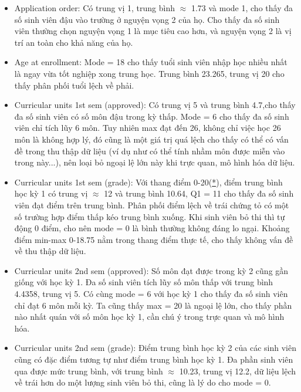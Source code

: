     \begin{itemize}
        \item Application order: Có trung vị 1, trung bình $\approx$ 1.73 và mode 1, cho thấy đa số sinh viên đậu vào trường ở nguyện vọng 2 của họ. Cho thấy đa số sinh viên thường chọn nguyện vọng 1 là mục tiêu cao hơn, và nguyện vọng 2 là vị trí an toàn cho khả năng của họ.

        \item Age at enrollment: Mode = 18 cho thấy tuổi sinh viên nhập học nhiều nhất là ngay vừa tốt nghiệp xong trung học. Trung bình 23.265, trung vị 20 cho thấy phân phối tuổi lệch về phải. 

        \item Curricular units 1st sem (approved): Có trung vị 5 và trung bình 4.7,cho thấy đa số sinh viên có số môn đậu trong kỳ thấp. Mode = 6 cho thấy đa số sinh viên chỉ tích lũy 6 môn. Tuy nhiên max đạt đến 26, không chỉ việc học 26 môn là không hợp lý, đó cũng là một giá trị quá lệch cho thấy có thể có vấn đề trong thu thập dữ liệu (ví dụ như có thể tính nhầm môn được miễn vào trong này...), nên loại bỏ ngoại lệ lớn này khi trực quan, mô hình hóa dữ liệu.

        \item Curricular units 1st sem (grade): Với thang điểm 0-20(\hyperlink{line:1-grade1} {*}), điểm trung bình học kỳ 1 có trung vị $\approx$ 12 và trung bình 10.64, Q1 = 11 cho thấy đa số sinh viên đạt điểm trên trung bình. Phân phối điểm lệch về trái chứng tỏ có một số trường hợp điểm thấp kéo trung bình xuống. Khi sinh viên bỏ thi thì tự động 0 điểm, cho nên mode = 0 là bình thường không đáng lo ngại. Khoảng điểm min-max 0-18.75 nằm trong thang điểm thực tế, cho thấy không vấn đề về thu thập dữ liệu. 

        \item Curricular units 2nd sem (approved): Số môn đạt được trong kỳ 2 cũng gần giống với học kỳ 1. Đa số sinh viên tích lũy số môn thấp với trung bình 4.4358, trung vị 5. Có cùng mode = 6 với học kỳ 1 cho thấy đa số sinh viên chỉ đạt 6 môn mỗi kỳ. Ta cũng thấy max = 20 là ngoại lệ lớn, cho thấy phần nào nhất quán với số môn học kỳ 1, cần chú ý trong trực quan và mô hình hóa.

        \item Curricular units 2nd sem (grade): Điểm trung bình học kỳ 2 của các sinh viên cũng có đặc điểm tương tự như điểm trung bình học kỳ 1. Đa phần sinh viên qua được mức trung bình, với trung bình $\approx$ 10.23, trung vị 12.2, dữ liệu lệch về trái hơn do một lượng sinh viên bỏ thi, cũng là lý do cho mode = 0.

        
    \end{itemize}

